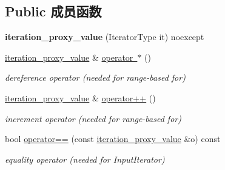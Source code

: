 \subsection*{Public 成员函数}
\begin{DoxyCompactItemize}
\item 
\mbox{\label{classnlohmann_1_1detail_1_1iteration__proxy__value_a459dd8961b80b2089d8161c9aa466581}} 
{\bfseries iteration\+\_\+proxy\+\_\+value} (Iterator\+Type it) noexcept
\item 
\mbox{\label{classnlohmann_1_1detail_1_1iteration__proxy__value_a41384b6e643e8388e4c849b6b8f1312a}} 
\mbox{\hyperlink{classnlohmann_1_1detail_1_1iteration__proxy__value}{iteration\+\_\+proxy\+\_\+value}} \& \mbox{\hyperlink{classnlohmann_1_1detail_1_1iteration__proxy__value_a41384b6e643e8388e4c849b6b8f1312a}{operator $\ast$}} ()
\begin{DoxyCompactList}\small\item\em dereference operator (needed for range-\/based for) \end{DoxyCompactList}\item 
\mbox{\label{classnlohmann_1_1detail_1_1iteration__proxy__value_adf4db2aef31822f3a179435158a4de11}} 
\mbox{\hyperlink{classnlohmann_1_1detail_1_1iteration__proxy__value}{iteration\+\_\+proxy\+\_\+value}} \& \mbox{\hyperlink{classnlohmann_1_1detail_1_1iteration__proxy__value_adf4db2aef31822f3a179435158a4de11}{operator++}} ()
\begin{DoxyCompactList}\small\item\em increment operator (needed for range-\/based for) \end{DoxyCompactList}\item 
\mbox{\label{classnlohmann_1_1detail_1_1iteration__proxy__value_af2b78a8b9c9276b07c928b21bb1e2d54}} 
bool \mbox{\hyperlink{classnlohmann_1_1detail_1_1iteration__proxy__value_af2b78a8b9c9276b07c928b21bb1e2d54}{operator==}} (const \mbox{\hyperlink{classnlohmann_1_1detail_1_1iteration__proxy__value}{iteration\+\_\+proxy\+\_\+value}} \&o) const
\begin{DoxyCompactList}\small\item\em equality operator (needed for Input\+Iterator) \end{DoxyCompactList}\item 

\end{DoxyCompactItemize}
